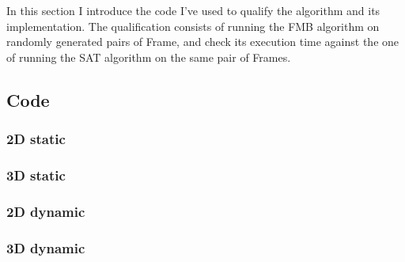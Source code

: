 \documentclass[12pt, a4paper]{article}
\begin{document}
In this section I introduce the code I've used to qualify the algorithm and its implementation. The qualification consists of running the FMB algorithm on randomly generated pairs of Frame, and check its execution time against the one of running the SAT algorithm on the same pair of Frames.\\

\subsection{Code}

\subsubsection{2D static}

\begin{scriptsize}
\begin{ttfamily}

\end{ttfamily}
\end{scriptsize}

\subsubsection{3D static}

\begin{scriptsize}
\begin{ttfamily}

\end{ttfamily}
\end{scriptsize}

\subsubsection{2D dynamic}

\begin{scriptsize}
\begin{ttfamily}

\end{ttfamily}
\end{scriptsize}

\subsubsection{3D dynamic}

\begin{scriptsize}
\begin{ttfamily}

\end{ttfamily}
\end{scriptsize}
\end{document}
